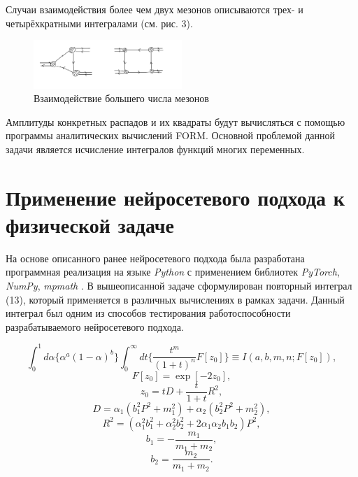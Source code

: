 \documentclass[a4paper,12pt]{article} %
\renewcommand{\figurename}{Рисунок\_}
\begin{document}
Случаи взаимодействия более чем двух мезонов описываются трех- и четырёхкратными интегралами (см. рис. 3).

\renewcommand{\figurename}{Рисунок}
\renewcommand{\thefigure}{3}
\begin{figure}[H]
    \centering
    \includegraphics[width=0.5\textwidth]{multiple-interactions.png}
    \caption{Взаимодействие большего числа мезонов}

\end{figure}

Амплитуды конкретных распадов и их квадраты будут вычисляться с помощью программы аналитических вычислений FORM. Основной проблемой данной задачи является исчисление интегралов функций многих переменных.

\section{Применение нейросетевого подхода к физической задаче}

На основе описанного ранее нейросетевого подхода была разработана программная реализация на языке \textit{Python} с применением библиотек \textit{PyTorch}, \textit{NumPy}, \textit{mpmath} \cite{python}\cite{pytorch}\cite{numpy}\cite{mpmath}. В вышеописанной задаче сформулирован повторный интеграл (13), который применяется в различных вычислениях в рамках задачи. Данный интеграл был одним из способов тестирования работоспособности разрабатываемого нейросетевого подхода.

\begin{equation}
    \int_{0}^{1}d\alpha\{\alpha^{a}(1 - \alpha)^b\}\int_{0}^{\infty}dt\{\frac{t^m}{(1+t)^n}F[z_{0}]\} \equiv I(a, b, m, n; F[z_{0}]),
\end{equation}
\begin{equation}   
    F[z_0] = \exp[-2z_0],
\end{equation}
\begin{equation} 
    z_0 = tD + \frac{t}{1 + t}R^2,
\end{equation}
\begin{equation}     
    D = \alpha_1(b_1^{2}P^2 + m_1^2) + \alpha_2(b_2^{2}P^2 + m_2^2),
\end{equation}
\begin{equation} 
        R^2 = (\alpha_1^{2}b_1^2 + \alpha_2^{2}b_2^2 + 2\alpha_{1}\alpha_{2}b_{1}b_2)P^2,
\end{equation}
\begin{equation} 
    b_1 = -\frac{m_1}{m_1 + m_2},
\end{equation}
\begin{equation} 
    b_2 = \frac{m_2}{m_1 + m_2}.
\end{equation}
\end{document}
